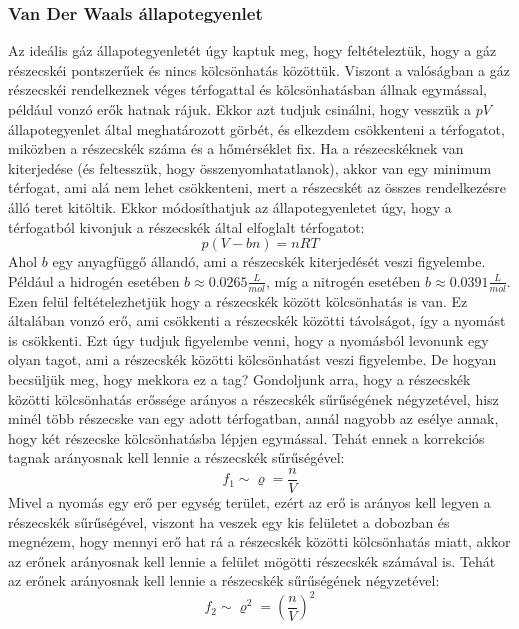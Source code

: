 \documentclass[a4paper,12pt]{article}
\begin{document}
\subsubsection*{Van Der Waals állapotegyenlet}
Az ideális gáz állapotegyenletét úgy kaptuk meg, hogy feltételeztük, hogy a gáz részecskéi pontszerűek és nincs kölcsönhatás közöttük. Viszont a valóságban a gáz részecskéi rendelkeznek véges térfogattal és kölcsönhatásban állnak
egymással, például vonzó erők hatnak rájuk. Ekkor azt tudjuk csinálni, hogy vesszük a $pV$ állapotegyenlet által meghatározott görbét, és elkezdem csökkenteni a térfogatot, miközben a részecskék száma és a hőmérséklet fix.
Ha a részecskéknek van kiterjedése (és feltesszük, hogy összenyomhatatlanok), akkor van egy minimum térfogat, ami alá nem lehet csökkenteni, mert a részecskét az összes rendelkezésre álló teret kitöltik.
Ekkor módosíthatjuk az állapotegyenletet úgy, hogy a térfogatból kivonjuk a részecskék által elfoglalt térfogatot:
\begin{equation}
    p (V - b n) = n R T
\end{equation}
Ahol $b$ egy anyagfüggő állandó, ami a részecskék kiterjedését veszi figyelembe. Például a hidrogén esetében $b \approx 0.0265 \frac{L}{mol}$, míg a nitrogén esetében $b \approx 0.0391 \frac{L}{mol}$.
Ezen felül feltételezhetjük hogy a részecskék között kölcsönhatás is van. Ez általában vonzó erő, ami csökkenti a részecskék közötti távolságot, így a nyomást is csökkenti.
Ezt úgy tudjuk figyelembe venni, hogy a nyomásból levonunk egy olyan tagot, ami a részecskék közötti kölcsönhatást veszi figyelembe. De hogyan becsüljük meg, hogy mekkora ez a tag?
Gondoljunk arra, hogy a részecskék közötti kölcsönhatás erőssége arányos a részecskék sűrűségének négyzetével, hisz minél több részecske van egy adott térfogatban, annál nagyobb az esélye annak, hogy két részecske kölcsönhatásba lépjen egymással.
Tehát ennek a korrekciós tagnak arányosnak kell lennie a részecskék sűrűségével:
\begin{equation}
    f_1 \sim \varrho = \frac{n}{V}
\end{equation}
Mivel a nyomás egy erő per egység terület, ezért az erő is arányos kell legyen a részecskék sűrűségével, viszont ha veszek egy kis felületet a dobozban és megnézem, hogy mennyi erő hat rá a részecskék közötti kölcsönhatás miatt, akkor az erőnek arányosnak kell lennie a felület mögötti részecskék számával is. Tehát az erőnek arányosnak kell lennie a részecskék sűrűségének négyzetével:
\begin{equation}
    f_2 \sim \varrho^2 = \left(\frac{n}{V}\right)^2
\end{equation}
\end{document}
